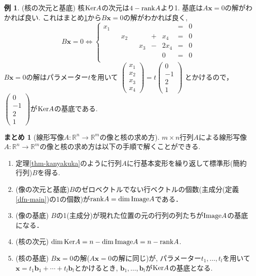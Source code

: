 \documentclass[dvipdfmx,a4paper,11pt]{article}
\newcommand{\R}{\mathbb{R}}
\theoremstyle{definition}
\newtheorem{exa}[thm]{例}
\newtheorem{suma}[thm]{まとめ}
\begin{document}
\begin{exa}
(核の次元と基底) 
核${\rm Ker}A$の次元は$4-{\rm rank}A$より1.
基底は$A\bm{x}=0$の解がわかれば良い. これはまとめ\ref{suma-gauss}から$B\bm{x}=0$の解がわかれば良く, 
$$
B\bm{x}=0
\Leftrightarrow
 \left\{ 
\begin{matrix}
x_1&  &  &  && &&    = & 0 \\
&  &x_2 &  & &+&x_4&  = & 0 \\
&  & &  & x_3&-&2x_4&    = & 0 \\
&  & &  &  & & 0&    = & 0 \\
\end{matrix}
\right.
 $$
$B\bm{x}=0$の解はパラメーター$t$を用いて
 $
 \begin{pmatrix}
 x_1\\x_2\\x_3\\x_4
 \end{pmatrix}
=
t
 \begin{pmatrix}
 0\\-1\\2\\1
 \end{pmatrix}
 $
 とかけるので， $\begin{pmatrix}
 0\\-1\\2\\1
 \end{pmatrix}$が${\rm Ker}A$の基底である. 
 \end{exa}
 
 
\begin{tcolorbox}[
    colback = white,
    colframe = green!35!black,
    fonttitle = \bfseries,
    breakable = true]
        \begin{suma}[線形写像$A : \R^n \to \R^m$の像と核の求め方]
\label{suma-gauss}
$m \times n$行列$A$による線形写像$A : \R^n \to \R^m$の像と核の求め方は以下の手順で解くことができる. 
\begin{enumerate}
   \setlength{\parskip}{0cm} 
  \setlength{\itemsep}{0cm}
 \item 定理\ref{thm-kanyakuka}のように行列$A$に行基本変形を繰り返して標準形(簡約行列)$B$を得る.
 \item (像の次元と基底)$B$のゼロベクトルでない行ベクトルの個数(主成分(定義\ref{dfn-main})の1の個数)が${\rm rank}A=\dim {\rm Image}A$である．
 \item (像の基底) $B$の1(主成分)が現れた位置の元の行列の列たちが${\rm Image}A$の基底になる． 
 \item (核の次元) $\dim {\rm Ker}A = n-\dim {\rm Image}A=n-{\rm rank}A$.
 \item (核の基底) $B \bm{x}=0$の解($A\bm{x}=0$の解に同じ)が, パラメーター$t_1, \ldots, t_l$を用いて$\bm{x}=t_1\bm{b}_1+\cdots+t_l\bm{b}_l$とかけるとき, $\bm{b}_1, \ldots, \bm{b}_l$が${\rm Ker}A$の基底となる.
 \end{enumerate}
\end{suma}
 \end{tcolorbox}
 
\end{document}

